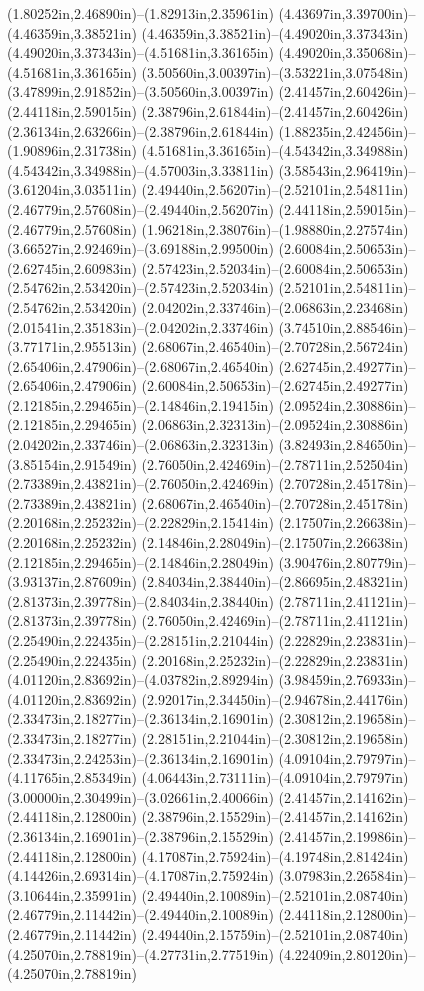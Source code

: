 (1.80252in,2.46890in)--(1.82913in,2.35961in) (4.43697in,3.39700in)--(4.46359in,3.38521in) (4.46359in,3.38521in)--(4.49020in,3.37343in) (4.49020in,3.37343in)--(4.51681in,3.36165in) (4.49020in,3.35068in)--(4.51681in,3.36165in) (3.50560in,3.00397in)--(3.53221in,3.07548in) (3.47899in,2.91852in)--(3.50560in,3.00397in) (2.41457in,2.60426in)--(2.44118in,2.59015in) (2.38796in,2.61844in)--(2.41457in,2.60426in) (2.36134in,2.63266in)--(2.38796in,2.61844in) (1.88235in,2.42456in)--(1.90896in,2.31738in) (4.51681in,3.36165in)--(4.54342in,3.34988in) (4.54342in,3.34988in)--(4.57003in,3.33811in) (3.58543in,2.96419in)--(3.61204in,3.03511in) (2.49440in,2.56207in)--(2.52101in,2.54811in) (2.46779in,2.57608in)--(2.49440in,2.56207in) (2.44118in,2.59015in)--(2.46779in,2.57608in) (1.96218in,2.38076in)--(1.98880in,2.27574in) (3.66527in,2.92469in)--(3.69188in,2.99500in) (2.60084in,2.50653in)--(2.62745in,2.60983in) (2.57423in,2.52034in)--(2.60084in,2.50653in) (2.54762in,2.53420in)--(2.57423in,2.52034in) (2.52101in,2.54811in)--(2.54762in,2.53420in) (2.04202in,2.33746in)--(2.06863in,2.23468in) (2.01541in,2.35183in)--(2.04202in,2.33746in) (3.74510in,2.88546in)--(3.77171in,2.95513in) (2.68067in,2.46540in)--(2.70728in,2.56724in) (2.65406in,2.47906in)--(2.68067in,2.46540in) (2.62745in,2.49277in)--(2.65406in,2.47906in) (2.60084in,2.50653in)--(2.62745in,2.49277in) (2.12185in,2.29465in)--(2.14846in,2.19415in) (2.09524in,2.30886in)--(2.12185in,2.29465in) (2.06863in,2.32313in)--(2.09524in,2.30886in) (2.04202in,2.33746in)--(2.06863in,2.32313in) (3.82493in,2.84650in)--(3.85154in,2.91549in) (2.76050in,2.42469in)--(2.78711in,2.52504in) (2.73389in,2.43821in)--(2.76050in,2.42469in) (2.70728in,2.45178in)--(2.73389in,2.43821in) (2.68067in,2.46540in)--(2.70728in,2.45178in) (2.20168in,2.25232in)--(2.22829in,2.15414in) (2.17507in,2.26638in)--(2.20168in,2.25232in) (2.14846in,2.28049in)--(2.17507in,2.26638in) (2.12185in,2.29465in)--(2.14846in,2.28049in) (3.90476in,2.80779in)--(3.93137in,2.87609in) (2.84034in,2.38440in)--(2.86695in,2.48321in) (2.81373in,2.39778in)--(2.84034in,2.38440in) (2.78711in,2.41121in)--(2.81373in,2.39778in) (2.76050in,2.42469in)--(2.78711in,2.41121in) (2.25490in,2.22435in)--(2.28151in,2.21044in) (2.22829in,2.23831in)--(2.25490in,2.22435in) (2.20168in,2.25232in)--(2.22829in,2.23831in) (4.01120in,2.83692in)--(4.03782in,2.89294in) (3.98459in,2.76933in)--(4.01120in,2.83692in) (2.92017in,2.34450in)--(2.94678in,2.44176in) (2.33473in,2.18277in)--(2.36134in,2.16901in) (2.30812in,2.19658in)--(2.33473in,2.18277in) (2.28151in,2.21044in)--(2.30812in,2.19658in) (2.33473in,2.24253in)--(2.36134in,2.16901in) (4.09104in,2.79797in)--(4.11765in,2.85349in) (4.06443in,2.73111in)--(4.09104in,2.79797in) (3.00000in,2.30499in)--(3.02661in,2.40066in) (2.41457in,2.14162in)--(2.44118in,2.12800in) (2.38796in,2.15529in)--(2.41457in,2.14162in) (2.36134in,2.16901in)--(2.38796in,2.15529in) (2.41457in,2.19986in)--(2.44118in,2.12800in) (4.17087in,2.75924in)--(4.19748in,2.81424in) (4.14426in,2.69314in)--(4.17087in,2.75924in) (3.07983in,2.26584in)--(3.10644in,2.35991in) (2.49440in,2.10089in)--(2.52101in,2.08740in) (2.46779in,2.11442in)--(2.49440in,2.10089in) (2.44118in,2.12800in)--(2.46779in,2.11442in) (2.49440in,2.15759in)--(2.52101in,2.08740in) (4.25070in,2.78819in)--(4.27731in,2.77519in) (4.22409in,2.80120in)--(4.25070in,2.78819in) 